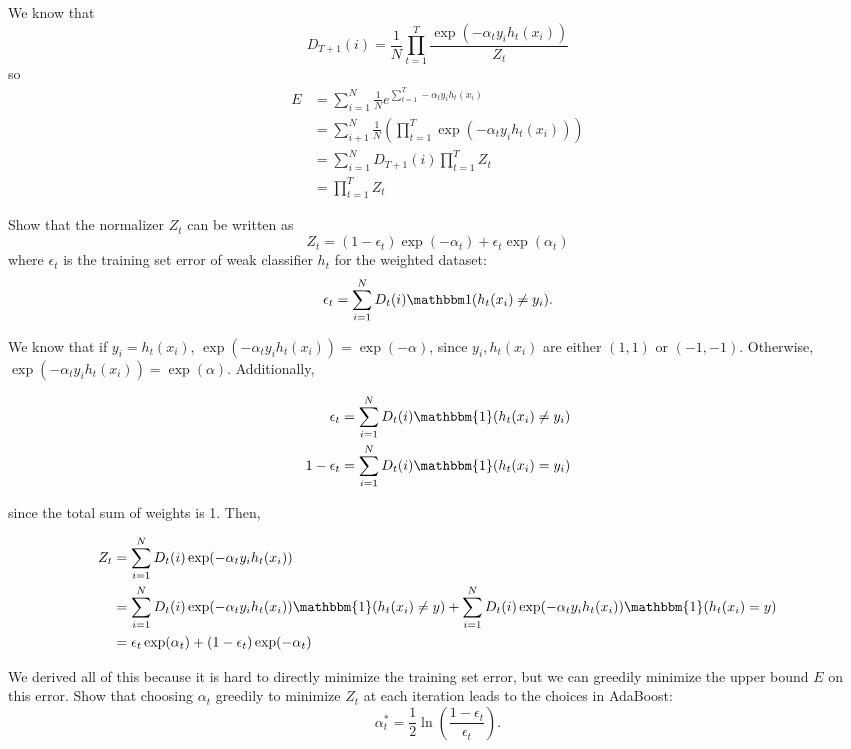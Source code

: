 \begin{solution}
    We know that
    \[
        D_{T+1}(i) = \frac{1}{N} \prod_{t=1}^T \frac{\exp(- \alpha_t y_i h_t(x_i))}{Z_t}
    \]
    so
    \begin{align*}
        E &= \sum_{i=1}^N  \frac{1}{N} e^{\sum_{t=1}^T - \alpha_t y_i h_t(x_i)}\\
        &= \sum_{i+1}^N \frac{1}{N} \left( \prod_{t=1}^T \exp(-\alpha_t y_i h_t(x_i))\right)\\
        &= \sum_{i=1}^N D_{T+1}(i) \prod_{t=1}^T Z_t\\
        &= \prod_{t=1}^T Z_t
    \end{align*}
\end{solution}

\newpage

\problem[5]
Show that the normalizer $Z_t$ can be written as
\[Z_t = (1 - \epsilon_t) \exp(-\alpha_t) + \epsilon_{t} \exp(\alpha_t)\]
where $\epsilon_t$ is the training set error of weak classifier $h_t$ for the weighted dataset:
\[\epsilon_t = \sum\limits_{i=1}^N D_t(i)\mathbbm1(h_t(x_i) \neq y_i).\]

\begin{solution}
    We know that if $y_i = h_t(x_i)$, $\exp(-\alpha_t y_i h_t(x_i)) = \exp(-\alpha)$, since $y_i, h_t(x_i)$ are either $(1,1)$ or $(-1, -1)$. Otherwise, $\exp(-\alpha_t y_i h_t(x_i)) = \exp(\alpha)$. Additionally,

    \begin{align*}
        \epsilon_t &= \sum_{i=1}^N D_t(i) \mathbbm{1}(h_t(x_i) \neq y_i)\\
        1 - \epsilon_t &= \sum_{i=1}^N D_t(i) \mathbbm{1}(h_t(x_i) = y_i)
    \end{align*}

    since the total sum of weights is 1. Then,
    
    \begin{align*}
        Z_t &= \sum_{i=1}^N D_t(i) \exp(-\alpha_t y_i h_t(x_i))\\
        &= \sum_{i=1}^N D_t(i) \exp(-\alpha_t y_i h_t(x_i)) \mathbbm{1}(h_t(x_i) \neq y) + \sum_{i=1}^N D_t(i) \exp(-\alpha_t y_i h_t(x_i)) \mathbbm{1}(h_t(x_i) = y)\\
        &=  \epsilon_t \exp(\alpha_t) + (1- \epsilon_t) \exp(- \alpha_t)
    \end{align*}
\end{solution}

\newpage

\problem[2]
We derived all of this because it is hard to directly minimize the training set error, but we can greedily minimize the upper bound $E$ on this error. Show that choosing $\alpha_t$
greedily to minimize $Z_t$ at each iteration leads to the choices in
AdaBoost:
$$\alpha_{t}^* = \frac{1}{2} \ln \left(\frac{1 - \epsilon_t}{\epsilon_t} \right).$$


